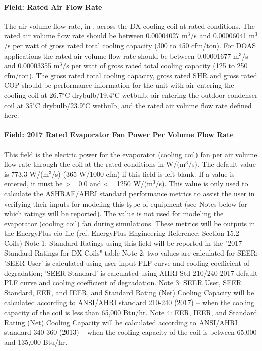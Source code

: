 \paragraph{Field: Rated Air Flow Rate}\label{field-rated-air-flow-rate-2}

The air volume flow rate, in \si{\volumeFlowRate}, across the DX cooling coil at rated conditions. The rated air volume flow rate should be between 0.00004027 m\(^{3}\)/s and 0.00006041 m\(^{3}\)/s per watt of gross rated total cooling capacity (300 to 450 cfm/ton). For DOAS applications the rated air volume flow rate should be between 0.00001677 m\(^{3}\)/s and 0.00003355 m\(^{3}\)/s per watt of gross rated total cooling capacity (125 to 250 cfm/ton). The gross rated total cooling capacity, gross rated SHR and gross rated COP should be performance information for the unit with air entering the cooling coil at 26.7$^\circ$C drybulb/19.4$^\circ$C wetbulb, air entering the outdoor condenser coil at 35$^\circ$C drybulb/23.9$^\circ$C wetbulb, and the rated air volume flow rate defined here.

\paragraph{Field: 2017 Rated Evaporator Fan Power Per Volume Flow Rate}

This field is the electric power for the evaporator (cooling coil) fan per air volume flow rate through the coil at the rated conditions in W/(m\(^{3}\)/s). The default value is 773.3 W/(m\(^{3}\)/s) (365 W/1000 cfm) if this field is left blank. If a value is entered, it must be \textgreater{}= 0.0 and \textless{}= 1250 W/(m\(^{3}\)/s). This value is only used to calculate the ASHRAE/AHRI standard performance metrics to assist the user in verifying their inputs for modeling this type of equipment (see Notes below for which ratings will be reported).  The value is not used for modeling the evaporator (cooling coil) fan during simulations. These metrics will be outputs in the EnergyPlus eio file (ref. EnergyPlus Engineering Reference, Section 15.2 Coils)
Note 1: Standard Ratings using this field will be reported in the "2017 Standard Ratings for DX Coils" table
Note 2: two values are calculated for SEER: 'SEER User' is calculated using user-input PLF curve and cooling coefficient of degradation; 'SEER Standard' is calculated using AHRI Std 210/240-2017 default PLF curve and cooling coefficient of degradation.
Note 3: SEER User, SEER Standard, EER, and IEER, and Standard Rating (Net) Cooling Capacity will be calculated according to ANSI/AHRI standard 210-240 (2017) -- when the cooling capacity of the coil is less than 65,000 Btu/hr.
Note 4: EER, IEER, and Standard Rating (Net) Cooling Capacity will be calculated according to ANSI/AHRI standard 340-360 (2013) -- when the cooling capacity of the coil is between 65,000 and 135,000 Btu/hr.

